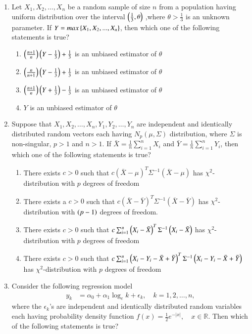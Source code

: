 \documentclass[journal]{IEEEtran}
\begin{document}
\begin{enumerate}
\item Let $X_1, X_2, \ldots, X_n$ be a random sample of size $n$ from a population having uniform distribution over the interval $\left(\frac{1}{3},\theta\right)$ ,where $\theta > \frac{1}{3}$ is an unknown parameter. If $Y = max\left\{X_1,X_2,...,X_n\right\}$, then which one of the following statements is true?

\begin{enumerate}
    \item $\left(\frac{n+1}{n}\right)\left(Y-\frac{1}{3}\right) + \frac{1}{3}$ is an unbiased estimator of $\theta$
    \item $\left(\frac{n}{n+1}\right)\left(Y-\frac{1}{3}\right) + \frac{1}{3}$ is an unbiased estimator of $\theta$
    \item $\left(\frac{n+1}{n}\right)\left(Y+\frac{1}{3}\right) - \frac{1}{3}$ is an unbiased estimator of $\theta$
    \item $Y$ is an unbiased estimator of $\theta$
\end{enumerate}

\item Suppose that $X_1, X_2, \ldots, X_n,Y_1, Y_2, \ldots, Y_n$ are independent and identically distributed random vectors each having $N_p(\mu, \Sigma)$ distribution, where $\Sigma$ is non-singular, $p > 1$ and $n>1$. If $\bar{X} = \frac{1}{n} \sum_{i=1}^{n} X_i$ and $\bar{Y} = \frac{1}{n} \sum_{i=1}^{n} Y_i$, then which one of the following statements is true?

\begin{enumerate}
    \item There exists $c > 0$ such that $c (\bar{X} - \mu)^T \Sigma^{-1} (\bar{X} - \mu)$ has $\chi^2$-distribution with $p$ degrees of freedom
    \item There exists a $c > 0$ such that $c (\bar{X} - \bar{Y})^T \Sigma^{-1} (\bar{X} - \bar{Y})$ has $\chi^2$-distribution with $\left(p-1\right)$ degrees of freedom.
    \item There exists $c > 0$ such that $c \sum_{i=1}^{n} \left(X_i - \bar{X}\right)^T \Sigma^{-1} \left(X_i - \bar{X}\right) $ has $\chi^2$-distribution with $p$ degrees of freedom
    \item There exists $c > 0$ such that $c \sum_{i=1}^{n} \left(X_i - Y_i - \bar{X}+\bar{Y}\right)^T \Sigma^{-1}  \left(X_i - Y_i - \bar{X}+\bar{Y}\right)$ has $\chi^2$-distribution with $p$ degrees of freedom
\end{enumerate}

\item Consider the following regression model
\begin{align*}
y_k &= \alpha_0 + \alpha_1 \log_e k + \epsilon_k, \quad k = 1, 2, \dots, n,
\end{align*}
where the $ \epsilon_k $'s are independent and identically distributed random variables each having probability density function $f(x) = \frac{1}{2}e^{-|x|}, \quad x \in \mathbb{R}$.
Then which of the following statements is true?


\end{enumerate}
\end{document}
